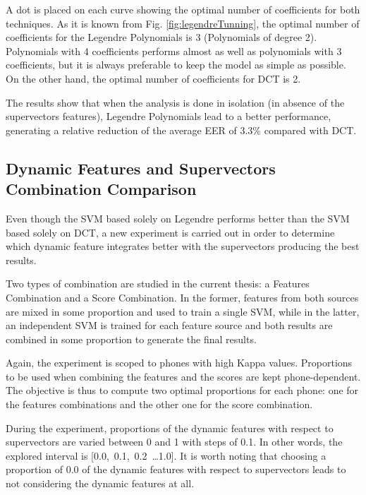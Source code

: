A dot is placed on each curve showing the optimal number of coefficients for both techniques.
As it is known from Fig. \ref{fig:legendreTunning},
the optimal number of coefficients for the
Legendre Polynomials is 3 (Polynomials of degree 2). Polynomials with 4 coefficients performs
almost as well as polynomials with 3 coefficients, but it is always preferable to keep the
model as simple as possible. On the other hand, the optimal number of coefficients for DCT is 2.

The results show that when the analysis is done in isolation (in absence of the supervectors
features), Legendre Polynomials lead to a better performance, generating a relative reduction
of the average EER of 3.3\% compared with DCT.

\subsection{Dynamic Features and Supervectors Combination Comparison}

Even though the SVM based solely on Legendre performs better than the SVM based solely on
DCT, a new experiment is carried out in order to determine which
dynamic feature integrates better
with the supervectors producing the best results.

Two types of combination are studied in the current thesis: a Features Combination and a Score
Combination. In the former, features from both sources are mixed in some proportion and
used to train a single SVM, while in the latter,
an independent SVM is trained for each feature source and
both results are combined in some proportion to generate the final results.

Again, the experiment is scoped to phones with high Kappa values.
Proportions to be used when combining the features and the scores are kept phone-dependent.
The objective is thus to compute two optimal proportions for each phone:
one for the features combinations and the other one for the score combination.

During the experiment, proportions of the dynamic features with respect to supervectors
are varied between 0 and 1 with steps of 0.1.
In other words, the explored interval is
\mbox{[0.0, 0.1, 0.2 \ldots 1.0]}.
It is worth noting that choosing
a proportion of 0.0 of the dynamic
features with respect to supervectors leads to not considering the dynamic features at all.


